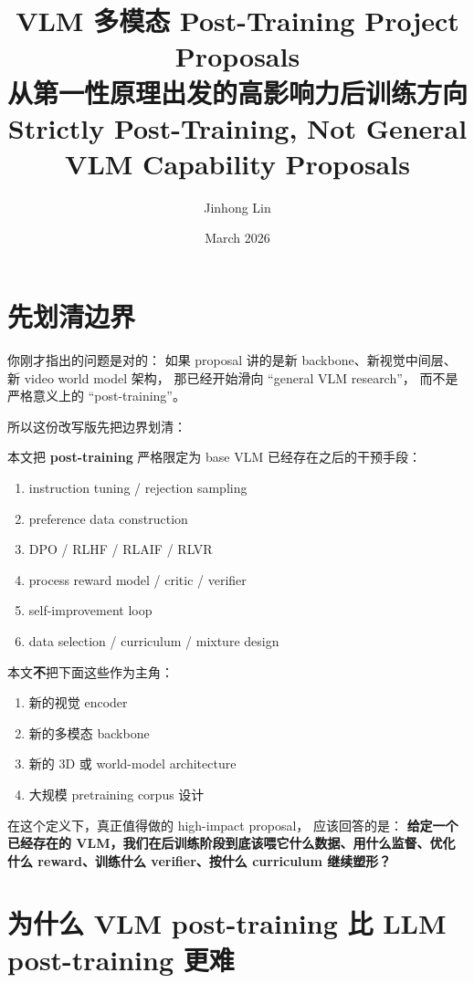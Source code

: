 \documentclass[12pt,a4paper]{article}
\title{\textbf{VLM 多模态 Post-Training Project Proposals}\\
\large{从第一性原理出发的高影响力后训练方向}\\[6pt]
\normalsize{Strictly Post-Training, Not General VLM Capability Proposals}}
\author{Jinhong Lin}
\date{March 2026}
\begin{document}
\maketitle

\section*{先划清边界}

你刚才指出的问题是对的：
如果 proposal 讲的是新 backbone、新视觉中间层、新 video world model 架构，
那已经开始滑向 ``general VLM research''，
而不是严格意义上的 ``post-training''。

所以这份改写版先把边界划清：

\begin{insightbox}
本文把 \textbf{post-training} 严格限定为 base VLM 已经存在之后的干预手段：
\begin{enumerate}[leftmargin=2em]
  \item instruction tuning / rejection sampling
  \item preference data construction
  \item DPO / RLHF / RLAIF / RLVR
  \item process reward model / critic / verifier
  \item self-improvement loop
  \item data selection / curriculum / mixture design
\end{enumerate}

本文\textbf{不}把下面这些作为主角：
\begin{enumerate}[leftmargin=2em]
  \item 新的视觉 encoder
  \item 新的多模态 backbone
  \item 新的 3D 或 world-model architecture
  \item 大规模 pretraining corpus 设计
\end{enumerate}
\end{insightbox}

在这个定义下，真正值得做的 high-impact proposal，
应该回答的是：
\textbf{给定一个已经存在的 VLM，我们在后训练阶段到底该喂它什么数据、用什么监督、优化什么 reward、训练什么 verifier、按什么 curriculum 继续塑形？}

\section*{为什么 VLM post-training 比 LLM post-training 更难}
\end{document}
